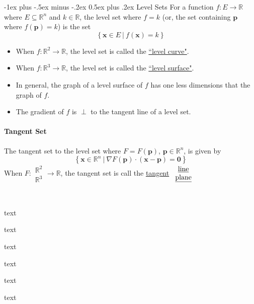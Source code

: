 \documentclass[10pt,landscape,letterpaper]{article}
\makeatletter
\renewcommand{\section}{\@startsection{section}{1}{0mm}%
                                {-1ex plus -.5ex minus -.2ex}%
                                {0.5ex plus .2ex}%
                                {\normalfont\large\bfseries}}
\newcommand{\bvec}[1]{\mathbf{#1}}
\newcommand{\vecspace}[1]{\mathbb{#1}}
\makeatother
\begin{document}
\begin{multicols}{3}
\section{Level Sets}
For a function $f: E \to \vecspace{R}$ where $E \subseteq \vecspace{R}^n$ and $k \in \vecspace R$, the level set where $f=k$  (or, the set containing $\bvec p$ where $f(\bvec p)=k$) is the set
\begin{equation*}
\left\{ \bvec{x} \in E \ \big\vert \ f(\bvec x) = k \right\}
\end{equation*}
\begin{itemize}[leftmargin=*,noitemsep]
    \item When $f:\mathbb R^2 \to \mathbb R$, the level set is called the \underline{``level curve"}.
    \item When $f:\mathbb R^3 \to \mathbb R$, the level set is called the \underline{``level surface"}.
    \item In general, the graph of a level surface of $f$ has one less dimensions that the graph of $f$.
    \item The gradient of $f$ is $\perp$ to the tangent line of a level set.
\end{itemize}

\paragraph{Tangent Set} The tangent set to the level set where $F=F(\bvec p)$, $\bvec p \in \mathbb R^n$, is given by \begin{equation*}
    \left\{  \bvec{x} \in \mathbb R^n \ \big\vert \ \nabla F(\bvec p) \cdot (\bvec x - \bvec p) = \bvec 0 \right\}
\end{equation*}
When $F: \begin{array}{c}\mathbb R^2 \\ \mathbb R^3\end{array}\to\mathbb R$, the tangent set is call the \underline{tangent}  $\begin{array}{c}\text{\underline{line}} \\ \text{\underline{plane}}\end{array}$

\



text

text

text

text

text

text


\end{multicols}
\end{document}
